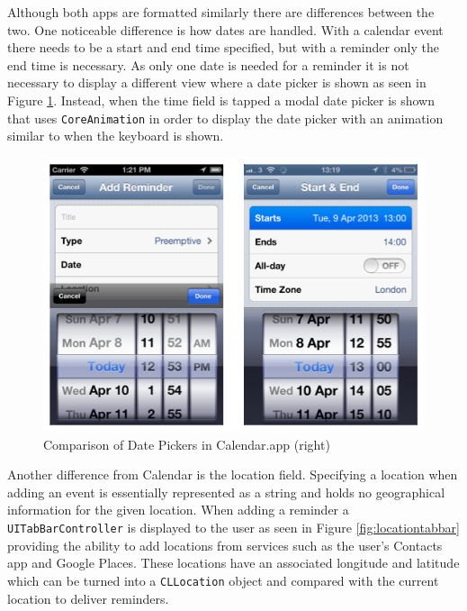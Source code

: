 \documentclass[12pt]{report}
\begin{document}
Although both apps are formatted similarly there are differences between the two. One noticeable difference is how dates are handled. With a calendar event there needs to be a start and end time specified, but with a reminder only the end time is necessary. As only one date is needed for a reminder it is not necessary to display a different view where a date picker is shown as seen in Figure \ref{fig:datepickers}. Instead, when the time field is tapped a modal date picker is shown that uses \texttt{CoreAnimation} in order to display the date picker with an animation similar to when the keyboard is shown.\\

\begin{figure}[H]
\centering
\includegraphics[scale=0.5]{images/date-picker}
\caption{Comparison of Date Pickers in Calendar.app (right)}
\label{fig:datepickers}
\end{figure}

Another difference from Calendar is the location field. Specifying a location when adding an event is essentially represented as a string and holds no geographical information for the given location. When adding a reminder a \texttt{UITabBarController} is displayed to the user as seen in Figure \ref{fig:locationtabbar} providing the ability to add locations from services such as the user's Contacts app and Google Places. These locations have an associated longitude and latitude which can be turned into a \texttt{CLLocation} object and compared with the current location to deliver reminders. 
\end{document}
